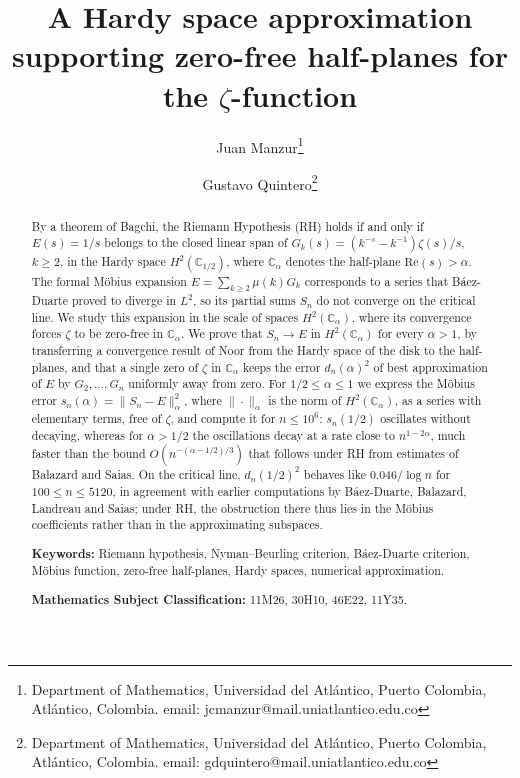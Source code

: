 \documentclass[11pt]{extarticle}
\numberwithin{equation}{section}
\theoremstyle{plain}
\theoremstyle{remark}
\begin{document}
\title{A Hardy space approximation supporting zero-free half-planes for the $\zeta$-function}

\author{
    Juan Manzur\thanks{Department of Mathematics,
    Universidad del Atlántico, Puerto Colombia, Atlántico, Colombia. email: jcmanzur@mail.uniatlantico.edu.co}
    \and
    Gustavo Quintero\thanks{Department of Mathematics, Universidad del Atlántico, Puerto Colombia, Atlántico, Colombia. email: gdquintero@mail.uniatlantico.edu.co}
}

\date{}
\maketitle

\begin{abstract}
By a theorem of Bagchi, the Riemann Hypothesis (RH) holds if and only if
$E(s) = 1/s$ belongs to the closed linear span of
$G_k(s) = (k^{-s} - k^{-1})\zeta(s)/s$, $k \geq 2$, in the Hardy space
$H^2(\mathbb{C}_{1/2})$, where $\mathbb{C}_\alpha$ denotes the half-plane
$\mathrm{Re}(s) > \alpha$. The formal M\"obius expansion
$E = \sum_{k \geq 2} \mu(k) G_k$ corresponds to a series that B\'aez-Duarte proved
to diverge in $L^2$, so its partial sums $S_n$ do not converge on the critical line.
We study this expansion in the scale of spaces $H^2(\mathbb{C}_\alpha)$, where its
convergence forces $\zeta$ to be zero-free in $\mathbb{C}_\alpha$. We prove that
$S_n \to E$ in $H^2(\mathbb{C}_\alpha)$ for every $\alpha > 1$, by transferring a
convergence result of Noor from the Hardy space of the disk to the half-planes, and
that a single zero of $\zeta$ in $\mathbb{C}_\alpha$ keeps the error
$d_n(\alpha)^2$ of best approximation of $E$ by $G_2, \dots, G_n$ uniformly away from
zero. For $1/2 \leq \alpha \leq 1$ we express the M\"obius error
$s_n(\alpha) = \|S_n - E\|^2_\alpha$, where $\|\cdot\|_\alpha$ is the norm of
$H^2(\mathbb{C}_\alpha)$, as a series with elementary terms, free of $\zeta$, and
compute it for $n \leq 10^6$: $s_n(1/2)$ oscillates without decaying, whereas for
$\alpha > 1/2$ the oscillations decay at a rate close to $n^{1-2\alpha}$, much faster
than the bound $O(n^{-(\alpha-1/2)/3})$ that follows under RH from estimates of
Balazard and Saias. On the critical line, $d_n(1/2)^2$ behaves like $0.046/\log n$ for
$100 \leq n \leq 5120$, in agreement with earlier computations by B\'aez-Duarte,
Balazard, Landreau and Saias; under RH, the obstruction there thus lies in the
M\"obius coefficients rather than in the approximating subspaces.

\bigskip
\noindent
\textbf{Keywords:} Riemann hypothesis, Nyman--Beurling criterion, B\'aez-Duarte criterion, M\"obius function, zero-free half-planes, Hardy spaces, numerical approximation.

\medskip
\noindent
\textbf{Mathematics Subject Classification:} 11M26, 30H10, 46E22, 11Y35.
\end{abstract}
\end{document}
